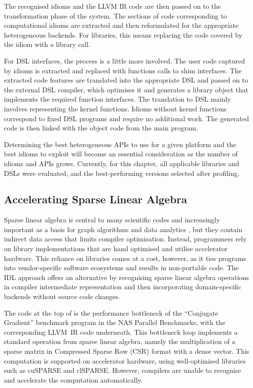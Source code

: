     The recognised idioms and the LLVM IR code are then passed on to the
    transformation phase of the system.
    The sections of code corresponding to computational idioms are extracted
    and then reformulated for the appropriate heterogeneous backends.
    For libraries, this means replacing the code covered by the idiom with a
    library call. 

    For DSL interfaces, the process is a little more involved.
    The user code captured by idioms is extracted and replaced with functions
    calls to shim interfaces.
    The extracted code features are translated into the appropriate DSL and
    passed on to the external DSL compiler, which optimises it and generates a
    library object that implements the required function interfaces.
    The translation to DSL mainly involves representing the kernel functions.
    Idioms without kernel functions correspond to fixed DSL programs and
    require no additional work.
    The generated code is then linked with the object code from the main program.

    Determining the best heterogeneous APIs to use for a given platform and the
    best idioms to exploit will become an essential consideration as the number
    of idioms and APIs grows.
    Currently, for this chapter, all applicable libraries and DSLs were
    evaluated, and the best-performing versions selected after profiling.

\subsection{Accelerating Sparse Linear Algebra}

    Sparse linear algebra is central to many scientific codes and increasingly
    important as a basis for graph algorithms and data analytics
    \cite{Kepner2015GraphsMA}, but they contain indirect data access that limits
    compiler optimisation.
    Instead, programmers rely on library implementations that are hand optimised
    and utilise accelerator hardware.
    This reliance on libraries comes at a cost, however, as it ties programs
    into vendor-specific software ecosystems and results in non-portable code.
    The IDL approach offers an alternative by recognising sparse linear algebra
    operations in compiler intermediate representation and then incorporating
    domain-specific backends without source code changes.

    The code at the top of  is the performance
    bottleneck of the ``Conjugate Gradient'' benchmark program in the NAS
    Parallel Benchmarks, with the corresponding LLVM~IR code underneath.
    This bottleneck loop implements a standard operation from sparse linear
    algebra, namely the multiplication of a sparse matrix in
    Compressed Sparse Row (CSR) format with a dense vector.
    This computation is supported on accelerator hardware, using well-optimised
    libraries such as cuSPARSE and clSPARSE.
    However, compilers are unable to recognise and accelerate the computation
    automatically.

